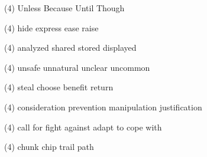 \begin{tasks}(4)
	\task Unless
	\task Because
	\task Until
	\task Though
\end{tasks}
\item
\begin{tasks}(4)
	\task hide
	\task express
	\task ease
	\task raise
\end{tasks}
\item
\begin{tasks}(4)
	\task analyzed
	\task shared
	\task stored
	\task displayed
\end{tasks}
\item
\begin{tasks}(4)
	\task unsafe
	\task unnatural
	\task unclear
	\task uncommon
\end{tasks}
\item
\begin{tasks}(4)
	\task steal
	\task choose
	\task benefit
	\task return
\end{tasks}
\item
\begin{tasks}(4)
	\task consideration
	\task prevention
	\task manipulation
	\task justification
\end{tasks}
\item
\begin{tasks}(4)
	\task call for
	\task fight against
	\task adapt to
	\task cope with
\end{tasks}
\item
\begin{tasks}(4)
	\task chunk
	\task chip
	\task trail
	\task path
\end{tasks}